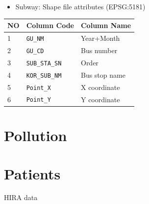 \documentclass[]{book}
\providecommand{\tightlist}{%
  \setlength{\itemsep}{0pt}\setlength{\parskip}{0pt}}
\theoremstyle{definition}
\theoremstyle{definition}
\theoremstyle{definition}
\theoremstyle{remark}
\begin{document}
\begin{itemize}
\tightlist
\item
  Subway: Shape file attributes (EPSG:5181)
\end{itemize}

\begin{longtable}[]{@{}lll@{}}
\toprule
NO & Column Code & Column Name\tabularnewline
\midrule
\endhead
1 & \texttt{GU\_NM} & Year+Month\tabularnewline
2 & \texttt{GU\_CD} & Bus number\tabularnewline
3 & \texttt{SUB\_STA\_SN} & Order\tabularnewline
4 & \texttt{KOR\_SUB\_NM} & Bus stop name\tabularnewline
5 & \texttt{Point\_X} & X coordinate\tabularnewline
6 & \texttt{Point\_Y} & Y coordinate\tabularnewline
\bottomrule
\end{longtable}

\chapter{Pollution}\label{pollution}

\chapter{Patients}\label{patients}

HIRA data


\end{document}

